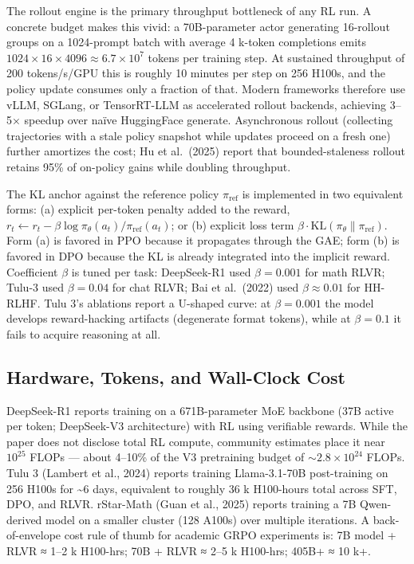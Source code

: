 The rollout engine is the primary throughput bottleneck of any RL run. A concrete budget makes this vivid: a 70B-parameter actor generating 16-rollout groups on a 1024-prompt batch with average 4 k-token completions emits \(1024 \times 16 \times 4096 \approx 6.7 \times 10^7\) tokens per training step. At sustained throughput of 200 tokens/s/GPU this is roughly 10 minutes per step on 256 H100s, and the policy update consumes only a fraction of that. Modern frameworks therefore use vLLM, SGLang, or TensorRT-LLM as accelerated rollout backends, achieving 3--5× speedup over naïve HuggingFace generate. Asynchronous rollout (collecting trajectories with a stale policy snapshot while updates proceed on a fresh one) further amortizes the cost; Hu et al.~(2025) report that bounded-staleness rollout retains 95\% of on-policy gains while doubling throughput.

The KL anchor against the reference policy \(\pi_{\mathrm{ref}}\) is implemented in two equivalent forms: (a) explicit per-token penalty added to the reward, \(r_t \leftarrow r_t - \beta \log \pi_\theta(a_t)/\pi_{\mathrm{ref}}(a_t)\); or (b) explicit loss term \(\beta \cdot \mathrm{KL}(\pi_\theta \| \pi_{\mathrm{ref}})\). Form (a) is favored in PPO because it propagates through the GAE; form (b) is favored in DPO because the KL is already integrated into the implicit reward. Coefficient \(\beta\) is tuned per task: DeepSeek-R1 used \(\beta = 0.001\) for math RLVR; Tulu-3 used \(\beta = 0.04\) for chat RLVR; Bai et al.~(2022) used \(\beta \approx 0.01\) for HH-RLHF. Tulu 3's ablations report a U-shaped curve: at \(\beta = 0.001\) the model develops reward-hacking artifacts (degenerate format tokens), while at \(\beta = 0.1\) it fails to acquire reasoning at all.

\subsection{Hardware, Tokens, and Wall-Clock Cost}\label{hardware-tokens-and-wall-clock-cost}

DeepSeek-R1 reports training on a 671B-parameter MoE backbone (37B active per token; DeepSeek-V3 architecture) with RL using verifiable rewards. While the paper does not disclose total RL compute, community estimates place it near \(10^{25}\) FLOPs --- about 4--10\% of the V3 pretraining budget of \(\sim 2.8 \times 10^{24}\) FLOPs. Tulu 3 (Lambert et al., 2024) reports training Llama-3.1-70B post-training on 256 H100s for \textasciitilde6 days, equivalent to roughly 36 k H100-hours total across SFT, DPO, and RLVR. rStar-Math (Guan et al., 2025) reports training a 7B Qwen-derived model on a smaller cluster (128 A100s) over multiple iterations. A back-of-envelope cost rule of thumb for academic GRPO experiments is: 7B model + RLVR ≈ 1--2 k H100-hrs; 70B + RLVR ≈ 2--5 k H100-hrs; 405B+ ≈ 10 k+.

